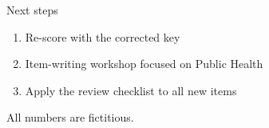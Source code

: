 \documentclass[aspectratio=169,11pt]{beamer}
\begin{document}
\begin{frame}{Next steps}
\begin{enumerate}
\item Re-score with the corrected key
\item Item-writing workshop focused on Public Health
\item Apply the review checklist to all new items
\end{enumerate}
\vfill
{\scriptsize\color{muted} All numbers are fictitious.}
\end{frame}
\end{document}
